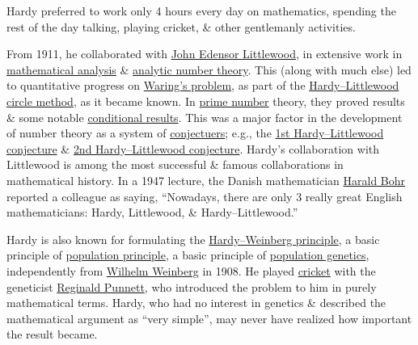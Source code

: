 \documentclass{article}
\begin{document}
{\sc Hardy} preferred to work only 4 hours every day on mathematics, spending the rest of the day talking, playing cricket, \& other gentlemanly activities.

From 1911, he collaborated with \href{https://en.wikipedia.org/wiki/John_Edensor_Littlewood}{\sc John Edensor Littlewood}, in extensive work in \href{https://en.wikipedia.org/wiki/Mathematical_analysis}{mathematical analysis} \& \href{https://en.wikipedia.org/wiki/Analytic_number_theory}{analytic number theory}. This (along with much else) led to quantitative progress on \href{https://en.wikipedia.org/wiki/Waring%27s_problem}{Waring's problem}, as part of the \href{https://en.wikipedia.org/wiki/Hardy%E2%80%93Littlewood_circle_method}{Hardy--Littlewood circle method}, as it became known. In \href{https://en.wikipedia.org/wiki/Prime_number}{prime number} theory, they proved results \& some notable \href{https://en.wikipedia.org/wiki/Conditional_result}{conditional results}. This was a major factor in the development of number theory as a system of \href{https://en.wikipedia.org/wiki/Conjecture}{conjectuers}; e.g., the \href{https://en.wikipedia.org/wiki/First_Hardy%E2%80%93Littlewood_conjecture}{1st Hardy--Littlewood conjecture} \& \href{https://en.wikipedia.org/wiki/Second_Hardy%E2%80%93Littlewood_conjecture}{2nd Hardy--Littlewood conjecture}. {\sc Hardy}'s collaboration with {\sc Littlewood} is among the most successful \& famous collaborations in mathematical history. In a 1947 lecture, the Danish mathematician \href{https://en.wikipedia.org/wiki/Harald_Bohr}{\sc Harald Bohr} reported a colleague as saying, ``Nowadays, there are only 3 really great English mathematicians: {\sc Hardy, Littlewood, \& Hardy--Littlewood}.''

{\sc Hardy} is also known for formulating the \href{https://en.wikipedia.org/wiki/Hardy%E2%80%93Weinberg_principle}{Hardy--Weinberg principle}, a basic principle of \href{https://en.wikipedia.org/wiki/Population_genetics}{population principle}, a basic principle of \href{https://en.wikipedia.org/wiki/Population_genetics}{population genetics}, independently from \href{https://en.wikipedia.org/wiki/Wilhelm_Weinberg}{\sc Wilhelm Weinberg} in 1908. He played \href{https://en.wikipedia.org/wiki/Cricket}{cricket} with the geneticist \href{https://en.wikipedia.org/wiki/Reginald_Punnett}{\sc Reginald Punnett}, who introduced the problem to him in purely mathematical terms. {\sc Hardy}, who had no interest in genetics \& described the mathematical argument as ``very simple'', may never have realized how important the result became.
\end{document}
